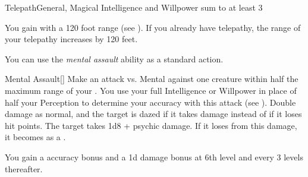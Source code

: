     \begin{feat}{Telepath}{General, Magical}
        \featpre Intelligence and Willpower sum to at least 3

         You gain  with a 120 foot range (see ).
        If you already have telepathy, the range of your telepathy increases by 120 feet.

         You can use the \textit{mental assault} ability as a standard action.
        \begin{activeability}{Mental Assault}[]
            \rankline
            Make an attack vs. Mental against one creature within half the maximum range of your .
            You use your full Intelligence or Willpower in place of half your Perception to determine your accuracy with this attack (see ).
            \crit Double damage as normal, and the target is dazed if it takes damage instead of if it loses hit points.
            \hit The target takes 1d8 +  psychic damage.
            If it loses  from this damage, it becomes \dazed as a .

            \rankline
            You gain a  accuracy bonus and a \plus1d damage bonus at 6th level and every 3 levels thereafter.
        \end{activeability}


\end{feat}
